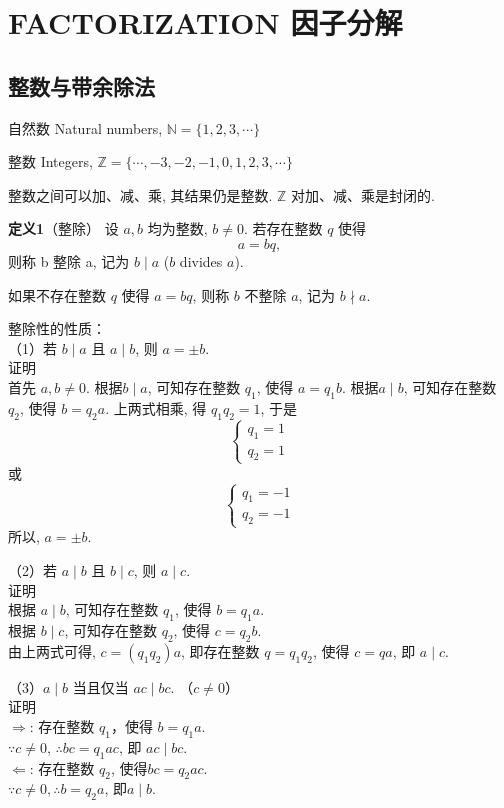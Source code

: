 \section{FACTORIZATION 因子分解}

\subsection{整数与带余除法}

自然数 Natural numbers, 
$ \mathbb{N} = \{ 1, 2, 3, \cdots \} $

整数 Integers, 
$ \mathbb{Z} = \{ \cdots, -3, -2, -1, 0, 1, 2, 3, \cdots \} $

整数之间可以加、减、乘, 其结果仍是整数. $ \mathbb{Z} $ 对加、减、乘是封闭的. 

\textbf{定义1}（整除） 设 $a, b$ 均为整数, $ b \neq 0 $. 若存在整数 $ q $ 使得
\[ 
    a = bq,
\]
则称 b 整除 a, 记为 $ b \mid a $ ($b$ divides $a$). 

如果不存在整数 $q$ 使得 $a=bq$, 则称 $b$ 不整除 $a$, 记为 $b \nmid a$. 

整除性的性质：\\
（1）若 $ b \mid a $ 且 $ a \mid b$, 则 $a = \pm b$.\\
证明\\
首先 $a,b\neq 0$.
根据$ b \mid a $, 可知存在整数 $q_1$, 使得 $a=q_1 b$. 
根据$ a \mid b$, 可知存在整数 $q_2$, 使得 $b=q_2 a$. 
上两式相乘, 得 $q_1 q_2 = 1$, 于是\\
\[
    \left\{ 
        \begin{array}{lc}
            q_1 = 1\\
            q_2 = 1
        \end{array}
    \right.
\]
或
\[
    \left\{ 
        \begin{array}{lc}
            q_1 = -1\\
            q_2 = -1
        \end{array}
    \right.
\]
所以, $a = \pm b$.

（2）若 $ a \mid b $ 且 $ b \mid c $, 则 $a \mid c$.\\
证明\\
根据 $a\mid b$, 可知存在整数 $q_1$, 使得 $b=q_1 a$.\\
根据 $b\mid c$, 可知存在整数 $q_2$, 使得 $c=q_2 b$.\\
由上两式可得, $c=(q_1q_2)a$, 即存在整数 $q=q_1q_2$, 使得 $c=qa$, 即 $a \mid c$.

（3）$a\mid b$ 当且仅当 $ac\mid bc$. （$c\neq 0$）\\
证明\\
$\Rightarrow$: 存在整数 $q_1$，使得 $b=q_1a$.\\
$\because c\neq 0$, $\therefore bc=q_1ac$, 即 $ac\mid bc$.\\
$\Leftarrow$: 存在整数  $q_2$, 使得$bc=q_2ac$.\\
$\because c\neq 0, \therefore b=q_2a$, 即$a\mid b$.

